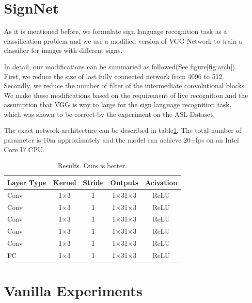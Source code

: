 \documentclass[10pt,twocolumn,letterpaper]{article}
\begin{document}
\blindtext

\blindtext


\section{SignNet}

As it is mentioned before, we formulate sign language recognition task as a classification problem and we use a modified version of VGG Network \cite{simonyan2014very} to train a classifier for images with different signs. 

In detail, our modifications can be summaried as followed(See figure\ref{fig:arch}). First, we reduce the size of last fully connected network from 4096 to 512. Secondly, we reduce the number of filter of the intermediate convolutional blocks. We make these modifications based on the requirement of live recognition and the assumption that VGG is way to large for the sign language recognition task, which was shown to be correct by the experiment on the ASL Dataset.

The exact network architecture can be described in table\ref{table:arch}. The total number of parameter is 10m approximately and the model can achieve 20+fps on an Intel Core I7 CPU.  

\begin{table}[h]
\begin{center}
\begin{tabular}{|l|c|c|c|c|}
\hline
Layer Type & Kernel & Stride & Outputs & Acivation \\
\hline\hline
Conv & 1$\times$3 & 1 & 1$\times$31$\times$3 & ReLU\\
Conv & 1$\times$3 & 1 & 1$\times$31$\times$3 & ReLU\\
Conv & 1$\times$3 & 1 & 1$\times$31$\times$3 & ReLU\\
Conv & 1$\times$3 & 1 & 1$\times$31$\times$3 & ReLU\\
Conv & 1$\times$3 & 1 & 1$\times$31$\times$3 & ReLU\\
FC & 1$\times$3 & 1 & 1$\times$31$\times$3 & ReLU\\
\hline
\end{tabular}
\end{center}
\caption{Results.  Ours is better.}
\label{table:arch}
\end{table}



\section{Vanilla Experiments}
\end{document}
